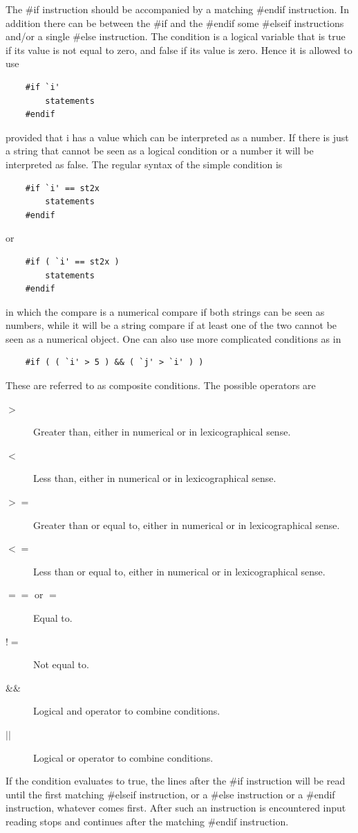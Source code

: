 \noindent The \#if instruction should be accompanied by a 
matching \#endif instruction. In addition there can be 
between the \#if and the \#endif some \#elseif instructions 
and/or a single \#else instruction. The condition is a 
logical variable that is true if its value is not equal to zero, and false 
if its value is zero. Hence it is allowed to use
\begin{verbatim}
    #if `i'
        statements
    #endif
\end{verbatim}
provided that i has a value which can be interpreted as a number. If there 
is just a string that cannot be seen as a logical condition 
or a number it will be interpreted as false. The regular syntax of the 
simple condition is
\begin{verbatim}
    #if `i' == st2x
        statements
    #endif
\end{verbatim}
or
\begin{verbatim}
    #if ( `i' == st2x )
        statements
    #endif
\end{verbatim}
in which the compare is a numerical compare if both strings can be seen as 
numbers, while it will be a string compare if at least one of the two 
cannot be seen as a numerical object. One can also use more complicated 
conditions as in
\begin{verbatim}
    #if ( ( `i' > 5 ) && ( `j' > `i' ) )
\end{verbatim}
These are referred to as composite conditions. The possible operators are
\begin{description}
\item[$>$] Greater than, either in numerical or in lexicographical sense.
\item[$<$] Less than, either in numerical or in lexicographical sense.
\item[$>=$] Greater than or equal to, either in numerical or in 
lexicographical sense.
\item[$<=$] Less than or equal to, either in numerical or in 
lexicographical sense.
\item[$==$ or $=$] Equal to.
\item[$!=$] Not equal to.
\item[$\&\&$] Logical and operator to combine conditions.
\item[$||$] Logical or operator to combine conditions.
\end{description}

If the condition evaluates to true, the lines after the \#if instruction 
will be read until the first matching \#elseif instruction, or a \#else 
instruction or a \#endif instruction, whatever comes first. After such an 
instruction is encountered input reading stops and continues after the 
matching \#endif instruction.

